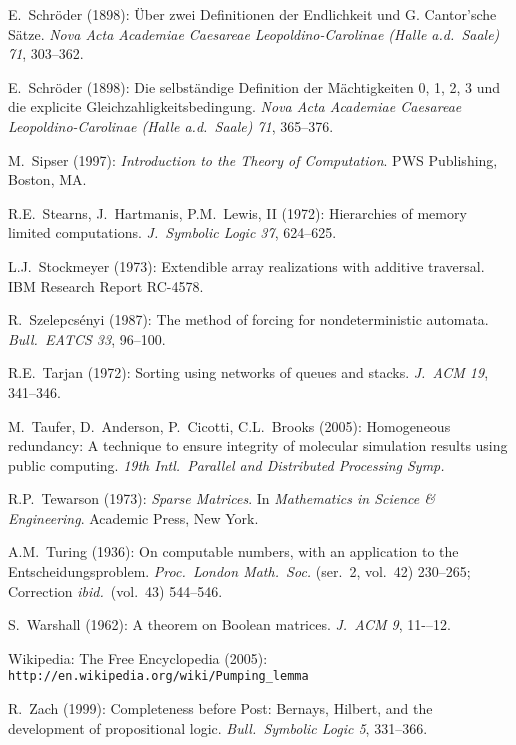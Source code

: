 \begin{thebibliography}{999}
E.~Schr\"{o}der (1898): \"{U}ber zwei Definitionen der Endlichkeit und
G. Cantor'sche S\"{a}tze.  {\it Nova Acta Academiae Caesareae
Leopoldino-Carolinae (Halle a.d.~Saale) 71}, 303--362.

E.~Schr\"{o}der (1898): Die selbst\"{a}ndige Definition der
M\"{a}chtigkeiten 0, 1, 2, 3 und die explicite
Gleichzahligkeitsbedingung.  {\it Nova Acta Academiae Caesareae
Leopoldino-Carolinae (Halle a.d.~Saale) 71}, 365--376.

M.~Sipser (1997):
{\it Introduction to the Theory of Computation}.
PWS Publishing, Boston, MA.

R.E.~Stearns, J.~Hartmanis, P.M.~Lewis, II (1972): Hierarchies of
memory limited computations.  {\it J.~Symbolic Logic 37}, 624--625.

L.J.~Stockmeyer (1973): Extendible array realizations with additive
traversal.  IBM Research Report RC-4578.

R.~Szelepcs\'{e}nyi (1987): The method of forcing for nondeterministic
automata.  {\em Bull.~EATCS 33}, 96--100.


R.E.~Tarjan (1972): Sorting using networks of queues and stacks.  {\it
  J.~ACM 19}, 341--346.

M.~Taufer, D.~Anderson, P.~Cicotti, C.L.~Brooks (2005): Homogeneous
redundancy: A technique to ensure integrity of molecular simulation
results using public computing.  {\it 19th Intl.~Parallel and
Distributed Processing Symp.}

R.P.~Tewarson (1973):
{\it Sparse Matrices}.  In {\it Mathematics in Science \&
  Engineering}.
Academic Press, New York.

A.M.~Turing (1936): On computable numbers, with an application to the
Entscheidungsproblem.  {\it Proc.~London Math.~Soc.} (ser.~2, vol.~42)
230--265; Correction {\it ibid.}~(vol.~43) 544--546.


S.~Warshall (1962): A theorem on Boolean matrices.  {\it J.~ACM 9},
11-–12.


Wikipedia: The Free Encyclopedia (2005): \\
{\tt http://en.wikipedia.org/wiki/Pumping\_lemma}


R.~Zach (1999): Completeness before Post: Bernays, Hilbert, and the
development of propositional logic.  {\it Bull.~Symbolic Logic 5},
331--366.

\end{thebibliography}

